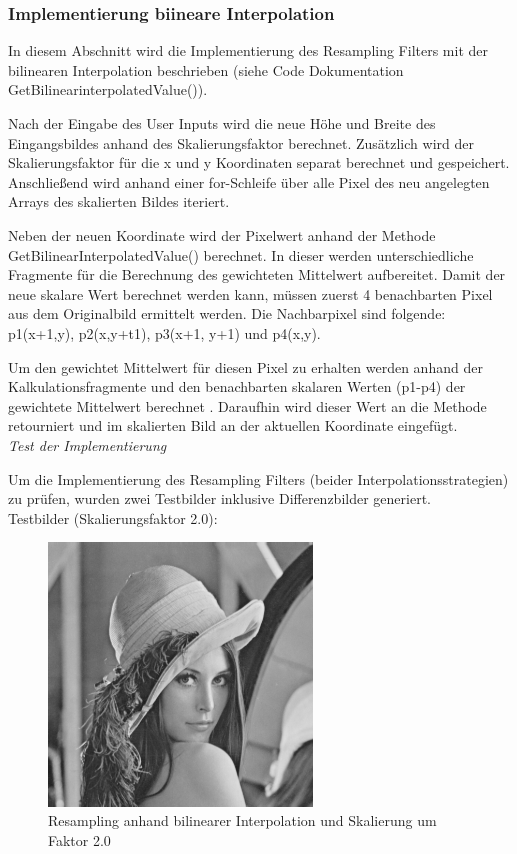 \documentclass[12pt,german]{article}
\begin{document}


\subsubsection{Implementierung biineare Interpolation}
In diesem Abschnitt wird die Implementierung des Resampling Filters mit der bilinearen Interpolation beschrieben (siehe Code Dokumentation GetBilinearinterpolatedValue()). 

Nach der Eingabe des User Inputs wird die neue Höhe und Breite des Eingangsbildes anhand des Skalierungsfaktor berechnet. Zusätzlich wird der Skalierungsfaktor für die x und y Koordinaten separat berechnet und gespeichert. Anschließend wird anhand einer for-Schleife über alle Pixel des neu angelegten Arrays des skalierten Bildes iteriert. 

Neben der neuen Koordinate wird der Pixelwert anhand der Methode GetBilinearInterpolatedValue() berechnet. In dieser werden unterschiedliche Fragmente für die Berechnung des gewichteten Mittelwert aufbereitet. Damit der neue skalare Wert berechnet werden kann, müssen zuerst 4 benachbarten Pixel aus dem Originalbild ermittelt werden. Die Nachbarpixel sind folgende: p1(x+1,y), p2(x,y+t1), p3(x+1, y+1) und p4(x,y). 


Um den gewichtet Mittelwert für diesen Pixel zu erhalten werden anhand der Kalkulationsfragmente und den benachbarten skalaren Werten (p1-p4) der gewichtete Mittelwert berechnet . Daraufhin wird dieser Wert an die Methode retourniert und im skalierten Bild an der aktuellen Koordinate eingefügt.\\

\textit{Test der Implementierung}

Um die Implementierung des Resampling Filters (beider Interpolationsstrategien) zu prüfen, wurden zwei Testbilder inklusive Differenzbilder generiert.\\

Testbilder (Skalierungsfaktor 2.0):

\begin{figure}[H]
	\centering
	\includegraphics[width=7cm]{images/bilineare-interpolation-final/bip-scaled-2.jpg}
	\caption{Resampling anhand bilinearer Interpolation und Skalierung um Faktor 2.0}
	\label{fig:resultResamplingBilinearInterpolation-2.0}
\end{figure}
\end{document}
